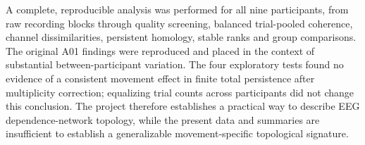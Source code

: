 A complete, reproducible analysis was performed for all nine participants, from raw recording blocks through quality screening, balanced trial-pooled coherence, channel dissimilarities, persistent homology, stable ranks and group comparisons. The original A01 findings were reproduced and placed in the context of substantial between-participant variation. The four exploratory tests found no evidence of a consistent movement effect in finite total persistence after multiplicity correction; equalizing trial counts across participants did not change this conclusion. The project therefore establishes a practical way to describe EEG dependence-network topology, while the present data and summaries are insufficient to establish a generalizable movement-specific topological signature.
